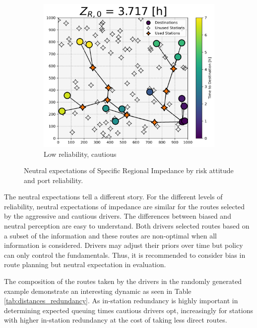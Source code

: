 \begin{figure}[H]
\begin{subfigure}[t]{.5\linewidth}
		\centering\captionsetup{width = .8\linewidth}
		\includegraphics[width = \linewidth]{figs/random_example_low_reliability_cautious_actual.png}
		\caption{Low reliability, cautious}
	\end{subfigure}
	\caption{Neutral expectations of Specific Regional Impedance by risk attitude and port reliability.}
	\label{fig:perceived_srta_random_actual}
\end{figure}

The neutral expectations tell a different story. For the different levels of reliability, neutral expectations of impedance are similar for the routes selected by the aggressive and cautious drivers. The differences between biased and neutral perception are easy to understand. Both drivers selected routes based on a subset of the information and these routes are non-optimal when all information is considered. Drivers may adjust their priors over time but policy can only control the fundamentals. Thus, it is recommended to consider bias in route planning but neutral expectation in evaluation.

The composition of the routes taken by the drivers in the randomly generated example demonstrate an interesting dynamic as seen in Table \ref{tab:distances_redundancy}. As in-station redundancy is highly important in determining expected queuing times cautious drivers opt, increasingly for stations with higher in-station redundancy at the cost of taking less direct routes.

